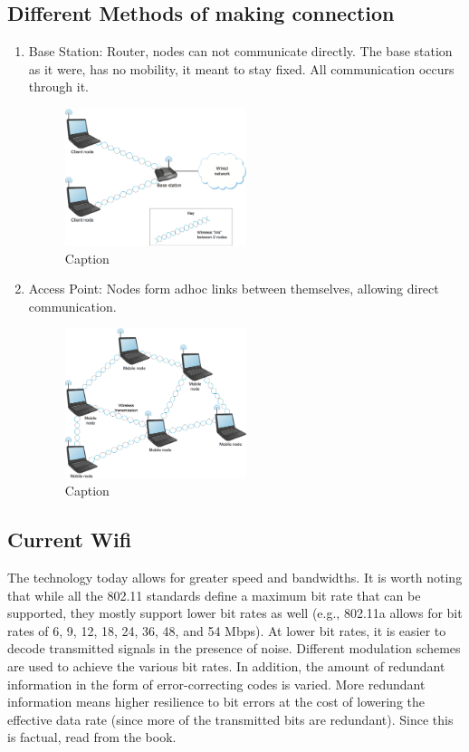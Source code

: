 \documentclass[12pt]{book}
\begin{document}
\subsection{Different Methods of making connection}
\begin{enumerate}
    \item Base Station: Router, nodes can not communicate directly. The base station as it were, has no mobility, it meant to stay fixed. All communication occurs through it.
    \begin{figure}[H]
        \centering
        \includegraphics[width = 0.5\textwidth]{Pictures/Wireless base station.png}
        \caption{Caption}
        \label{fig:my_label}
    \end{figure}
    \item Access Point: Nodes form adhoc links between themselves, allowing direct communication.
    \begin{figure}[H]
        \centering
        \includegraphics[width = 0.5\textwidth]{Pictures/Wireless mesh adhoc.png}
        \caption{Caption}
        \label{fig:my_label}
    \end{figure}
\end{enumerate}

\subsection{Current Wifi}
The technology today allows for greater speed and bandwidths. It is worth noting that while all the 802.11 standards define a maximum bit rate that can be supported, they mostly support lower bit rates as well (e.g., 802.11a allows for bit rates of 6, 9, 12, 18, 24, 36, 48, and 54 Mbps). At lower bit rates, it is easier to decode transmitted signals in the presence of noise. Different modulation schemes are used to achieve the various bit rates. In addition, the amount of redundant information in the form of error-correcting codes is varied. More redundant information means higher resilience to bit errors at the cost of lowering the effective data rate (since more of the transmitted bits are redundant). Since this is factual, read from the book.
\end{document}
